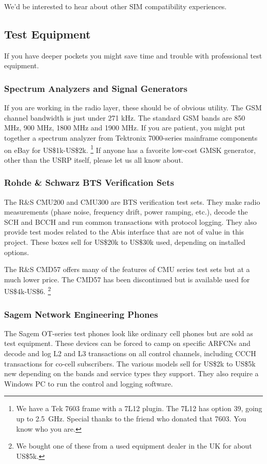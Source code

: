 \documentclass[11pt]{book}
\begin{document}
We'd be interested to hear about other SIM compatibility experiences.

\subsection{Test Equipment}
If you have deeper pockets you might save time and trouble with professional test equipment.

\subsubsection{Spectrum Analyzers and Signal Generators}
If you are working in the radio layer, these should be of obvious utility. The GSM channel bandwidth is just under 271 kHz. The standard GSM bands are 850 MHz, 900 MHz, 1800 MHz and 1900 MHz. If you are patient, you might put together a spectrum analyzer from Tektronix 7000-series mainframe components on eBay for US\$1k-US\$2k.%
\footnote{We have a Tek 7603 frame with a 7L12 plugin.  The 7L12 has option 39, going up to 2.5~GHz.  Special thanks to the friend who donated that 7603.  You know who you are.}
If anyone has a favorite low-cost GMSK generator, other than the USRP itself, please let us all know about.

\subsubsection{Rohde \& Schwarz BTS Verification Sets}
\label{sec:CMD57}
The R\&S CMU200 and CMU300 are BTS verification test sets. They make radio measurements (phase noise, frequency drift, power ramping, etc.), decode the SCH and BCCH and run common transactions with protocol logging. They also provide test modes related to the Abis interface that are not of value in this project. These boxes sell for US\$20k to US\$30k used, depending on installed options.

The R\&S CMD57 offers many of the features of CMU series test sets but at a much lower price. The CMD57 has been discontinued but is available used for US\$4k-US\$6.%
\footnote{We bought one of these from a used equipment dealer in the UK for about US\$5k.}

\subsubsection{Sagem Network Engineering Phones}
The Sagem OT-series test phones look like ordinary cell phones but are sold as test equipment. These devices can be forced to camp on specific ARFCNs and decode and log L2 and L3 transactions on all control channels, including CCCH transactions for co-cell subscribers. The various models sell for US\$2k to US\$5k new depending on the bands and service types they support.  They also require a Windows PC to run the control and logging software.



 
\end{document}
